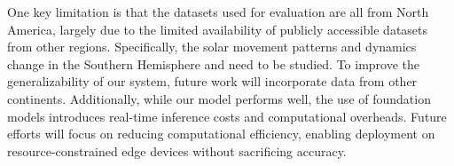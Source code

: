 One key limitation is that the datasets used for evaluation are all from North America, largely due to the limited availability of publicly accessible datasets from other regions. Specifically, the solar movement patterns and dynamics change in the Southern Hemisphere and need to be studied. To improve the generalizability of our system, future work will incorporate data from other continents. Additionally, while our model performs well, the use of foundation models introduces real-time inference costs and computational overheads. Future efforts will focus on reducing computational efficiency, enabling deployment on resource-constrained edge devices without sacrificing accuracy.







